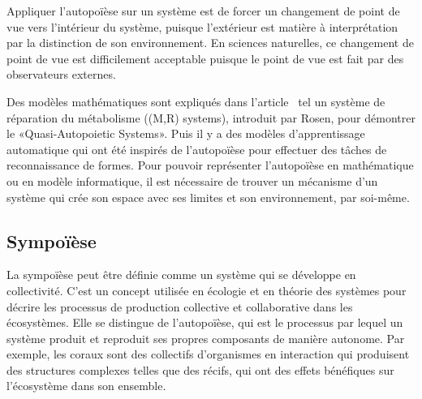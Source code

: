 

Appliquer l'autopoïèse sur un système est de forcer un changement de point de vue vers l'intérieur du système, puisque l'extérieur est matière à interprétation par la distinction de son environnement. En sciences naturelles, ce changement de point de vue est difficilement acceptable puisque le point de vue est fait par des observateurs externes.

Des modèles mathématiques sont expliqués dans l'article~\cite{tatsuya_computational_autopoiesis_2000} tel un système de réparation du métabolisme ((M,R) systems), introduit par Rosen, pour démontrer le «Quasi-Autopoietic Systems».
Puis il y a des modèles d'apprentissage automatique qui ont été inspirés de l'autopoïèse pour effectuer des tâches de reconnaissance de formes. Pour pouvoir représenter l'autopoïèse en mathématique ou en modèle informatique, il est nécessaire de trouver un mécanisme d'un système qui crée son espace avec ses limites et son environnement, par soi-même.


\subsection{Sympoïèse}

La sympoïèse peut être définie comme un système qui se développe en collectivité. C'est un concept utilisée en écologie et en théorie des systèmes pour décrire les processus de production collective et collaborative dans les écosystèmes. Elle se distingue de l'autopoïèse, qui est le processus par lequel un système produit et reproduit ses propres composants de manière autonome. Par exemple, les coraux sont des collectifs d'organismes en interaction qui produisent des structures complexes telles que des récifs, qui ont des effets bénéfiques sur l'écosystème dans son ensemble.

